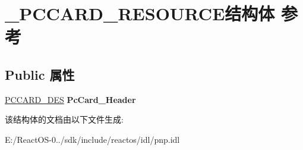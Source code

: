 \hypertarget{struct___p_c_c_a_r_d___r_e_s_o_u_r_c_e}{}\section{\+\_\+\+P\+C\+C\+A\+R\+D\+\_\+\+R\+E\+S\+O\+U\+R\+C\+E结构体 参考}
\label{struct___p_c_c_a_r_d___r_e_s_o_u_r_c_e}
\subsection*{Public 属性}
\begin{DoxyCompactItemize}
\item 
\mbox{\label{struct___p_c_c_a_r_d___r_e_s_o_u_r_c_e_a8a1996cdbccc6861d08b60e33a8af906}} 
\hyperlink{struct_pc_card___des__s}{P\+C\+C\+A\+R\+D\+\_\+\+D\+ES} {\bfseries Pc\+Card\+\_\+\+Header}
\end{DoxyCompactItemize}


该结构体的文档由以下文件生成\+:\begin{DoxyCompactItemize}
\item 
E\+:/\+React\+O\+S-\/0../sdk/include/reactos/idl/pnp.\+idl\end{DoxyCompactItemize}
